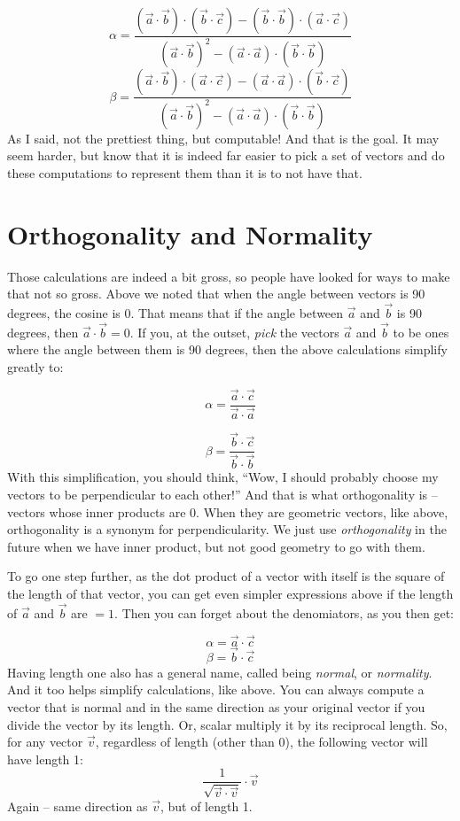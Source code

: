 \documentclass[
]{book}
\begin{document}
\[\alpha = \frac{(\vec{a}\cdot\vec{b})\cdot(\vec{b}\cdot\vec{c})-(\vec{b}\cdot\vec{b})\cdot(\vec{a}\cdot\vec{c})}{(\vec{a}\cdot\vec{b})^2 - (\vec{a}\cdot\vec{a})\cdot(\vec{b}\cdot\vec{b})}\]
\[\beta = \frac{(\vec{a}\cdot\vec{b})\cdot(\vec{a}\cdot\vec{c})-(\vec{a}\cdot\vec{a})\cdot(\vec{b}\cdot\vec{c})}{(\vec{a}\cdot\vec{b})^2 - (\vec{a}\cdot\vec{a})\cdot(\vec{b}\cdot\vec{b})}\]
As I said, not the prettiest thing, but computable! And that is the goal. It may seem harder, but know that it is indeed far easier to pick a set of vectors and do these computations to represent them than it is to not have that.

\hypertarget{orthogonality-and-normality-1}{%
\section{Orthogonality and Normality}\label{orthogonality-and-normality-1}}

Those calculations are indeed a bit gross, so people have looked for ways to make that not so gross. Above we noted that when the angle between vectors is 90 degrees, the cosine is 0. That means that if the angle between \(\vec{a}\) and \(\vec{b}\) is 90 degrees, then \(\vec{a}\cdot\vec{b} = 0\). If you, at the outset, \emph{pick} the vectors \(\vec{a}\) and \(\vec{b}\) to be ones where the angle between them is 90 degrees, then the above calculations simplify greatly to:

\[\alpha = \frac{\vec{a}\cdot\vec{c}}{\vec{a}\cdot\vec{a}}\]

\[\beta = \frac{\vec{b}\cdot\vec{c}}{\vec{b}\cdot\vec{b}}\]
With this simplification, you should think, ``Wow, I should probably choose my vectors to be perpendicular to each other!'' And that is what orthogonality is -- vectors whose inner products are 0. When they are geometric vectors, like above, orthogonality is a synonym for perpendicularity. We just use \emph{orthogonality} in the future when we have inner product, but not good geometry to go with them.

To go one step further, as the dot product of a vector with itself is the square of the length of that vector, you can get even simpler expressions above if the length of \(\vec{a}\) and \(\vec{b}\) are \(= 1\). Then you can forget about the denomiators, as you then get:

\[\alpha = \vec{a}\cdot\vec{c}\]
\[\beta = \vec{b}\cdot\vec{c}\]
Having length one also has a general name, called being \emph{normal}, or \emph{normality}. And it too helps simplify calculations, like above. You can always compute a vector that is normal and in the same direction as your original vector if you divide the vector by its length. Or, scalar multiply it by its reciprocal length. So, for any vector \(\vec{v}\), regardless of length (other than 0), the following vector will have length 1:
\[\frac{1}{\sqrt{\vec{v}\cdot\vec{v}}}\cdot\vec{v}\]
Again -- same direction as \(\vec{v}\), but of length 1.
\end{document}
